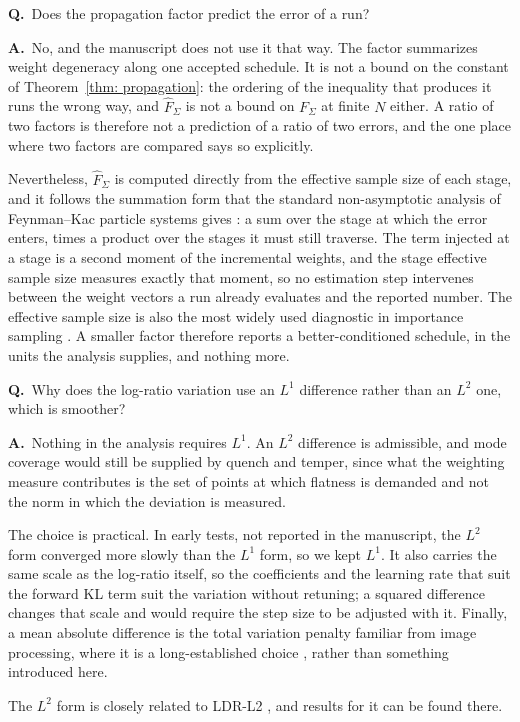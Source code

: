 \documentclass[11pt]{article}
\newcounter{qa}
\newcommand{\QA}[2]{%
  \par\bigskip
  \noindent\textbf{Q\theqa.}~#1\par
  \medskip
  \noindent\textbf{A\theqa.}~#2\par
  \medskip
}
\newcommand{\Q}[1]{\refstepcounter{qa}\QA{#1}}
\begin{document}
\Q{Does the propagation factor predict the error of a run?}
{No, and the manuscript does not use it that way. The factor summarizes weight
degeneracy along one accepted schedule. It is not a bound on the constant of
Theorem~\ref{thm: propagation}: the ordering of the inequality that produces it
runs the wrong way, and $\hat F_\Sigma$ is not a bound on $F_\Sigma$ at finite
$N$ either. A ratio of two factors is therefore not a prediction of a ratio of
two errors, and the one place where two factors are compared says so explicitly.

Nevertheless, $\hat F_\Sigma$ is computed directly from the effective sample
size of each stage, and it follows the summation form that the standard
non-asymptotic analysis of Feynman--Kac particle systems gives
\citep{delmoral2004feynman,chopin2020introduction}: a sum over the stage at
which the error enters, times a product over the stages it must still traverse.
The term injected at a stage is a second moment of the incremental weights, and
the stage effective sample size measures exactly that moment, so no estimation
step intervenes between the weight vectors a run already evaluates and the
reported number. The effective sample size is also the most widely used
diagnostic in importance sampling
\citep{liu2001monte,doucet2001introduction,martino2017rethinking}. A smaller
factor therefore reports a better-conditioned schedule, in the units the
analysis supplies, and nothing more.}

\Q{Why does the log-ratio variation use an $L^1$ difference rather than an
$L^2$ one, which is smoother?}
{Nothing in the analysis requires $L^1$. An $L^2$ difference is admissible, and
mode coverage would still be supplied by quench and temper, since what the
weighting measure contributes is the set of points at which flatness is
demanded and not the norm in which the deviation is measured.

The choice is practical. In early tests, not reported in the manuscript, the
$L^2$ form converged more slowly than the $L^1$ form, so we kept $L^1$. It also
carries the same scale as the log-ratio itself, so the coefficients and the
learning rate that suit the forward KL term suit the variation without
retuning; a squared difference changes that scale and would require the step
size to be adjusted with it. Finally, a mean absolute difference is the total
variation penalty familiar from image processing, where it is a long-established
choice \citep{rudin1992nonlinear}, rather than something introduced here.

The $L^2$ form is closely related to LDR-L2 \citep{schopmans2026ldr}, and
results for it can be found there.}
\end{document}
